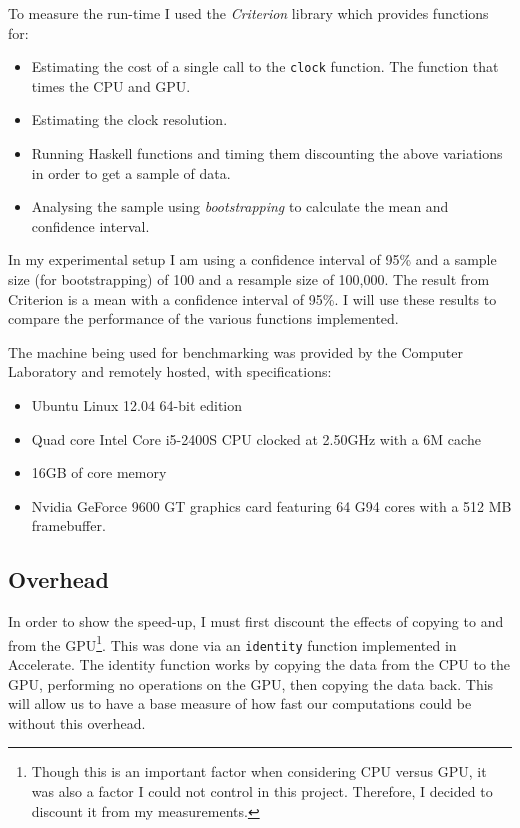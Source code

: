 \documentclass[
    12pt,
    a4paper,
    twoside,
    openright,
    ]{scrbook}
\begin{document}
To measure the run-time I used the \emph{Criterion} library\cite{criterion}
which provides functions for:

\begin{itemize}
\itemsep1pt\parskip0pt
\item Estimating the cost of a single call to the \texttt{clock} function.  The
  function that times the CPU and GPU.
\item Estimating the clock resolution.
\item Running Haskell functions and timing them discounting the above variations
  in order to get a sample of data.
\item Analysing the sample using \emph{bootstrapping}\cite{efron1981} to
  calculate the mean and confidence interval.
\end{itemize}

In my experimental setup I am using a confidence interval of 95\% and a sample
size (for bootstrapping) of 100 and a resample size of 100,000. The result from
Criterion is a mean with a confidence interval of 95\%. I will use these results
to compare the performance of the various functions implemented.

The machine being used for benchmarking was provided by the Computer Laboratory
and remotely hosted, with specifications:

\begin{itemize}
\itemsep1pt\parskip0pt
\item
  Ubuntu Linux 12.04 64-bit edition
\item
  Quad core Intel Core i5-2400S CPU clocked at 2.50GHz with a 6M cache
\item
  16GB of core memory
\item Nvidia GeForce 9600 GT graphics card featuring 64 G94 cores with a 512 MB
  framebuffer.
\end{itemize}

\subsection{Overhead}

In order to show the speed-up, I must first discount the effects of copying to
and from the GPU\footnote{Though this is an important factor when considering
  CPU versus GPU, it was also a factor I could not control in this
  project. Therefore, I decided to discount it from my measurements.}. This was
done via an \texttt{identity} function implemented in Accelerate. The identity
function works by copying the data from the CPU to the GPU, performing no
operations on the GPU, then copying the data back. This will allow us to have a
base measure of how fast our computations could be without this overhead.
\end{document}
